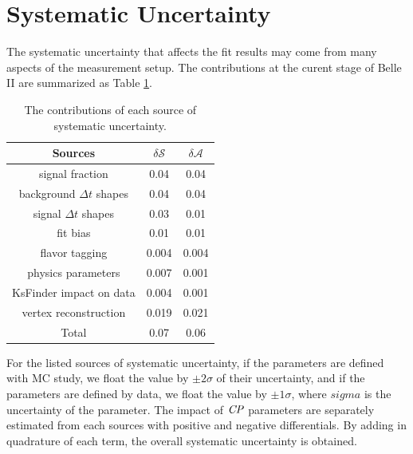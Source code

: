 \section{Systematic Uncertainty}
The systematic uncertainty that affects the fit results may come from many aspects of the measurement setup. The contributions at the curent stage of Belle II are summarized as Table \ref{tab:sy_sub}.

\begin{table}
	\centering
	\begin{tabular}{c|c|c} 
		\hline
		Sources &  $\delta \mathcal{S}$ & $\delta \mathcal{A}$\\
		\hline
		signal fraction  & 0.04 & 0.04 \\
		background $\Delta t$ shapes & 0.04 & 0.04\\
		signal $\Delta t$ shapes & 0.03 & 0.01 \\
		fit bias & 0.01 & 0.01 \\
		flavor tagging  & 0.004 & 0.004 \\
		physics parameters & 0.007 & 0.001\\ 
		KsFinder impact on data & 0.004 & 0.001\\
		vertex reconstruction & 0.019 & 0.021\\
		\hline
		Total & 0.07 & 0.06\\
		\hline
	\end{tabular}
	\caption{The contributions of each source of systematic uncertainty.}
	\label{tab:sy_sub}
\end{table}

For the listed sources of systematic uncertainty, if the parameters are defined with MC study, we float the value by $\pm 2 \sigma$ of their uncertainty, and if the parameters are defined by data, we float the value by $\pm 1 \sigma$, where $sigma$ is the uncertainty of the parameter. The impact of $\it{CP}$ parameters are separately estimated from each sources with positive and negative differentials. By adding in quadrature of each term, the overall systematic uncertainty is obtained. 



